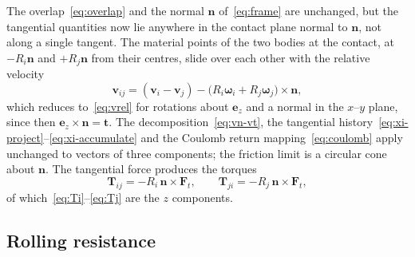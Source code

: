 The overlap~\eqref{eq:overlap} and the normal $\mathbf{n}$ of~\eqref{eq:frame} are unchanged, but the tangential quantities now lie anywhere in the contact plane normal to $\mathbf{n}$, not along a single tangent.
The material points of the two bodies at the contact, at $-R_{i}\mathbf{n}$ and $+R_{j}\mathbf{n}$ from their centres, slide over each other with the relative velocity
\begin{equation}
  \mathbf{v}_{ij}
  = (\mathbf{v}_{i}-\mathbf{v}_{j})
    - \bigl(R_{i}\boldsymbol{\omega}_{i}+R_{j}\boldsymbol{\omega}_{j}\bigr)\times\mathbf{n},
  \label{eq:vrel-3d}
\end{equation}
which reduces to~\eqref{eq:vrel} for rotations about $\mathbf{e}_{z}$ and a normal in the $x$--$y$ plane, since then $\mathbf{e}_{z}\times\mathbf{n}=\mathbf{t}$.
The decomposition~\eqref{eq:vn-vt}, the tangential history~\eqref{eq:xi-project}--\eqref{eq:xi-accumulate} and the Coulomb return mapping~\eqref{eq:coulomb} apply unchanged to vectors of three components; the friction limit is a circular cone about $\mathbf{n}$.
The tangential force produces the torques
\begin{equation}
  \mathbf{T}_{ij} = -R_{i}\,\mathbf{n}\times\mathbf{F}_{t},
  \qquad
  \mathbf{T}_{ji} = -R_{j}\,\mathbf{n}\times\mathbf{F}_{t},
  \label{eq:torque-3d}
\end{equation}
of which~\eqref{eq:Ti}--\eqref{eq:Tj} are the $z$ components.

\subsection{Rolling resistance}

